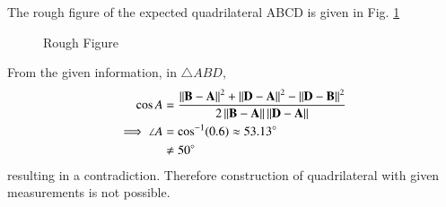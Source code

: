 
The rough figure of the expected quadrilateral ABCD is given in  Fig. \ref{constr/28/fig:myfigure}

\begin{figure}[!ht]
    \centering
    \resizebox{\columnwidth}{!}{}
    \caption{Rough Figure}
    \label{constr/28/fig:myfigure}	
    \end{figure}
    From the given information, in $\triangle ABD$,
\begin{align}
\cos{A}&=\frac{ \left\lVert\mathbf{B}-\mathbf{A}\right\rVert^2+ \left\lVert\mathbf{D}-\mathbf{A}\right\rVert^2- \left\lVert\mathbf{D}-\mathbf{B}\right\rVert^2}{2\left\lVert\mathbf{B}-\mathbf{A}\right\rVert \left\lVert\mathbf{D}-\mathbf{A}\right\rVert}
\\
\implies \angle A&=\cos^{-1}(0.6) \approx 53.13 \degree
\\
&\ne 50 \degree
\end{align}
 resulting in a contradiction.
Therefore construction of quadrilateral with given measurements is not possible.